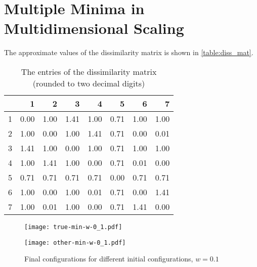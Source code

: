 \chapter{Multiple Minima in  Multidimensional Scaling }
\label{sec:MultMinima}


The approximate values of the dissimilarity matrix is shown in \autoref{table:diss_mat}.

\begin{table}[ht]
\centering
\ttfamily
\begin{tabular}{r|rrrrrrr}
  \hline
 & 1 & 2 & 3 & 4 & 5 & 6 & 7 \\ 
  \hline
  1 & 0.00 & 1.00 & 1.41 & 1.00 & 0.71 &1.00 & 1.00  \\ 
  2 & 1.00 & 0.00 & 1.00 & 1.41 & 0.71 & 0.00 & 0.01 \\ 
  3 & 1.41 & 1.00 & 0.00 & 1.00 & 0.71 & 1.00 & 1.00  \\ 
  4 & 1.00 & 1.41 & 1.00 & 0.00 & 0.71 & 0.01 & 0.00  \\ 
  5 & 0.71 & 0.71 & 0.71 & 0.71 & 0.00 & 0.71 & 0.71   \\ 
  6 & 1.00 & 0.00 & 1.00 & 0.01 & 0.71 & 0.00 & 1.41  \\ 
  7 & 1.00 & 0.01 & 1.00 & 0.00 & 0.71 & 1.41 & 0.00  \\ 
  
   \hline
\end{tabular}

\caption{The entries of the dissimilarity matrix (rounded to two decimal digits)\label{table:diss_mat}}
\end{table}

















\begin{figure}
\begin{minipage}[b]{0.46\linewidth}
\centering
\texttt{[image: true-min-w-0\_1.pdf]}

\label{fig:Finalconfig-MultMin-w-0_1_a}
\end{minipage}
\hspace{0.5cm}
\begin{minipage}[b]{0.46\linewidth}
\centering
\texttt{[image: other-min-w-0\_1.pdf]}

\label{fig:Finalconfig-MultMin-w-0_1_b}
\end{minipage}

\caption{Final configurations for different initial configurations, $w=0.1$ }
\label{fig:Finalconfig-MultMin-w-0_1}


\end{figure}




